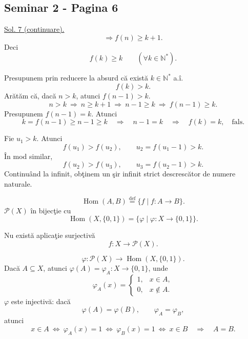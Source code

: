 
\subsection*{Seminar 2 - Pagina 6}

\noindent\underline{Sol. 7 (continuare).}
\[
\Longrightarrow f(n)\geq k+1.
\]
\noindent Deci
\[
 f(k)\geq k\qquad (\forall k\in\mathbb{N}^{*}).
\]

\noindent Presupunem prin reducere la absurd că există
$k\in\mathbb{N}^{*}$ a.î.
\[
 f(k)>k.
\]
\noindent Arătăm că, dacă $n>k$, atunci $f(n-1)>k$.
\[
 n>k\ \Longrightarrow\ n\geq k+1\ \Longrightarrow\ n-1\geq k
 \ \Longrightarrow\ f(n-1)\geq k.
\]
\noindent Presupunem $f(n-1)=k$. Atunci
\[
 k=f(n-1)\geq n-1\geq k
 \quad\Longrightarrow\quad n-1=k
 \quad\Longrightarrow\quad f(k)=k,\quad\text{fals}.
\]

\noindent Fie $u_1>k$. Atunci
\[
 f(u_1)>f(u_2),\qquad u_2=f(u_1-1)>k.
\]
\noindent În mod similar,
\[
 f(u_2)>f(u_3),\qquad u_3=f(u_2-1)>k.
\]
\noindent Continuând la infinit, obţinem un şir infinit strict
 descrescător de numere naturale.

\bigskip
\noindent{}\quad
\[
 \operatorname{Hom}(A,B)\overset{\mathrm{def}}{=}
 \{f\mid f:A\longrightarrow B\}.
\]
\noindent $\mathcal{P}(X)$ în bijecţie cu
\[
 \operatorname{Hom}(X,\{0,1\})
   =\{\varphi\mid\varphi:X\longrightarrow\{0,1\}\}.
\]

\medskip
\noindent{}\quad Nu există aplicaţie surjectivă
\[
 f:X\longrightarrow\mathcal{P}(X).
\]

\medskip
\noindent{}\quad
\[
 \varphi:\mathcal{P}(X)\longrightarrow
 \operatorname{Hom}(X,\{0,1\}).
\]
\noindent Dacă $A\subseteq X$, atunci
$\varphi(A)=\varphi_A:X\longrightarrow\{0,1\}$, unde
\[
 \varphi_A(x)=
 \begin{cases}
  1,&x\in A,\\
  0,&x\notin A.
 \end{cases}
\]
\noindent $\varphi$ este injectivă: dacă
\[
 \varphi(A)=\varphi(B),\qquad \varphi_A=\varphi_B,
\]
\noindent atunci
\[
 x\in A\ \Longleftrightarrow\ \varphi_A(x)=1
 \ \Longleftrightarrow\ \varphi_B(x)=1
 \ \Longleftrightarrow\ x\in B
 \quad\Longrightarrow\quad A=B.
\]
